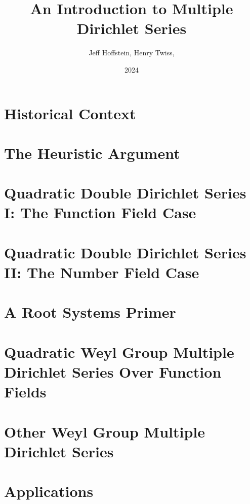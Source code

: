 \documentclass[12pt,oneside]{book}
\title{An Introduction to Multiple Dirichlet Series}
\author{Jeff Hoffstein, Henry Twiss, \todo{XXX}}
\date{2024}
\begin{document}
\maketitle
\pagestyle{empty}
\tableofcontents
\setcounter{page}{0}
\pagestyle{fancy}

\chapter{Historical Context}

\chapter{The Heuristic Argument}

\chapter{Quadratic Double Dirichlet Series I: The Function Field Case}
  

\chapter{Quadratic Double Dirichlet Series II: The Number Field Case}
  

\chapter{A Root Systems Primer}
  

\chapter{Quadratic Weyl Group Multiple Dirichlet Series Over Function Fields}
  

\chapter{Other Weyl Group Multiple Dirichlet Series}

\chapter{Applications}

\printindex


\end{document}
